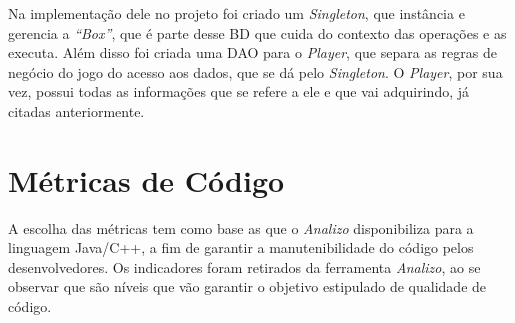 Na implementação dele no projeto foi criado um \textit{Singleton}, que instância e gerencia a \textit{“Box”}, que é parte desse BD que cuida do contexto das operações e as executa. Além disso foi criada uma DAO para o \textit{Player}, que separa as regras de negócio do jogo do acesso aos dados, que se dá pelo \textit{Singleton}. O \textit{Player}, por sua vez, possui todas as informações que se refere a ele e que vai adquirindo, já citadas anteriormente.

\section{Métricas de Código}

A escolha das métricas tem como base as que o \textit{Analizo} disponibiliza para a linguagem Java/C++, a fim de garantir a manutenibilidade do código pelos desenvolvedores. Os indicadores foram retirados da ferramenta \textit{Analizo}, ao se observar que são níveis que vão garantir o objetivo estipulado de qualidade de código.

